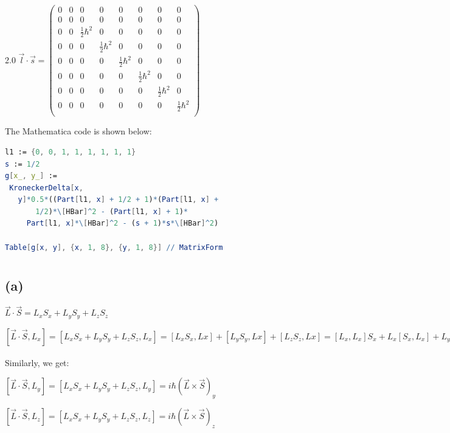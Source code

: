 \documentclass[12pt]{article}
\begin{document}
\begin{spacing}{2.0}
$\vec{l}\cdot \vec{s} =
\left(
\begin{array}{cccccccc}
 0 & 0 & 0 & 0 & 0 & 0 & 0 & 0 \\
 0 & 0 & 0 & 0 & 0 & 0 & 0 & 0 \\
 0 & 0 & \frac{1}{2}\hbar ^2 & 0 & 0 & 0 & 0 & 0 \\
 0 & 0 & 0 & \frac{1}{2}\hbar ^2 & 0 & 0 & 0 & 0 \\
 0 & 0 & 0 & 0 & \frac{1}{2}\hbar ^2 & 0 & 0 & 0 \\
 0 & 0 & 0 & 0 & 0 & \frac{1}{2}\hbar ^2 & 0 & 0 \\
 0 & 0 & 0 & 0 & 0 & 0 & \frac{1}{2}\hbar ^2 & 0 \\
 0 & 0 & 0 & 0 & 0 & 0 & 0 & \frac{1}{2}\hbar ^2 \\
\end{array}
\right)
$

The Mathematica code is shown below:

\begin{lstlisting}[language=Mathematica,breaklines=true,frame=single]
l1 := {0, 0, 1, 1, 1, 1, 1, 1}
s := 1/2
g[x_, y_] :=
 KroneckerDelta[x,
   y]*0.5*((Part[l1, x] + 1/2 + 1)*(Part[l1, x] +
       1/2)*\[HBar]^2 - (Part[l1, x] + 1)*
     Part[l1, x]*\[HBar]^2 - (s + 1)*s*\[HBar]^2)

Table[g[x, y], {x, 1, 8}, {y, 1, 8}] // MatrixForm
\end{lstlisting}

\section{} %

\subsection*{(a)}

$\vec{L}\cdot \vec{S}=L_xS_x+ L_yS_y+ L_zS_z$

$[\vec{L}\cdot \vec{S},L_x]= [L_xS_x+ L_yS_y+ L_zS_z, L_x]= [L_xS_x,Lx]+ [L_yS_y,Lx] + [L_zS_z,Lx] = [L_x,L_x]S_x+ L_x[S_x,L_x]+ L_y[S_y,L_x] +S_y[L_y,L_x] +[L_z,L_x]S_z +L_z[S_z,L_x]= i\hbar L_yS_z - i\hbar L_zS_y = i\hbar(\vec{L}\times \vec{S})_x$

Similarly, we get:

$[\vec{L}\cdot \vec{S},L_y]= [L_xS_x+ L_yS_y+ L_zS_z, L_y]= i\hbar(\vec{L}\times \vec{S})_y$

$[\vec{L}\cdot \vec{S},L_z]= [L_xS_x+ L_yS_y+ L_zS_z, L_z] =i\hbar(\vec{L}\times \vec{S})_z$


\end{spacing}
\end{document}

